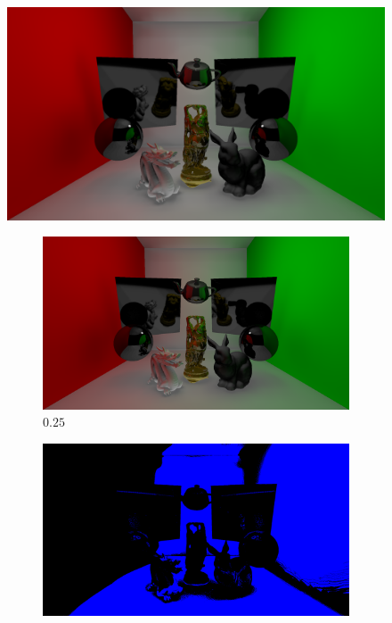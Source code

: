 \begin{figure}[H]
	\centering
	\includegraphics[width=.85\linewidth]{media/finals/test_s010.png}
	\caption{Demostración de reflexión especular con factor de longitud de marcha $0.1$ y volúmenes con resolución de $512^3$}
	\label{fig:spec_reflec010}
	\begin{subfigure}[b]{.49\linewidth}
		\centering
		\captionsetup{justification=centering}
		\caption*{$0.25$}
		\includegraphics[width=\linewidth]{media/finals/test_s025.png}
	\end{subfigure}%
	\hspace{0.01\textwidth}
	\begin{subfigure}[b]{.49\linewidth}
		\centering
		\captionsetup{justification=centering}
		\caption*{}
		\includegraphics[width=\linewidth]{media/finals/test_s025_diff.png}

\end{subfigure}
\end{figure}
